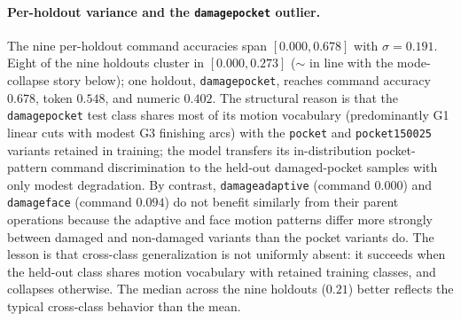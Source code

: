 \documentclass[sensors,article,submit,moreauthors,pdftex]{Definitions/mdpi}
\begin{document}
\paragraph{Per-holdout variance and the \texttt{damagepocket} outlier.} The nine per-holdout command accuracies span $[0.000, 0.678]$ with $\sigma = 0.191$. Eight of the nine holdouts cluster in $[0.000, 0.273]$ ($\sim$ in line with the mode-collapse story below); one holdout, \texttt{damagepocket}, reaches command accuracy $0.678$, token $0.548$, and numeric $0.402$. The structural reason is that the \texttt{damagepocket} test class shares most of its motion vocabulary (predominantly G1 linear cuts with modest G3 finishing arcs) with the \texttt{pocket} and \texttt{pocket150025} variants retained in training; the model transfers its in-distribution pocket-pattern command discrimination to the held-out damaged-pocket samples with only modest degradation. By contrast, \texttt{damageadaptive} (command $0.000$) and \texttt{damageface} (command $0.094$) do not benefit similarly from their parent operations because the adaptive and face motion patterns differ more strongly between damaged and non-damaged variants than the pocket variants do. The lesson is that cross-class generalization is not uniformly absent: it succeeds when the held-out class shares motion vocabulary with retained training classes, and collapses otherwise. The median across the nine holdouts ($0.21$) better reflects the typical cross-class behavior than the mean.
\end{document}

